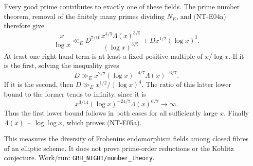 Every good prime contributes to exactly one of these fields.
The prime number theorem, removal of the finitely many primes
dividing $N_E$, and (NT-E04a) therefore give
\[
 \frac{x}{\log x}\ll_E
    D^{7/10}\frac{x^{4/5}\Lambda(x)^{3/5}}{(\log x)^{3/5}}
                      +D x^{1/2}(\log x)^3.               \tag{NT-E05c}
\]
At least one right-hand term is at least a fixed positive
multiple of $x/\log x$. If it is the first, solving the
inequality gives
\[
 D\gg_E x^{2/7}(\log x)^{-4/7}\Lambda(x)^{-6/7}.
\]
If it is the second, then $D\gg_E x^{1/2}/(\log x)^4$.
The ratio of this latter lower bound to the former tends to
infinity, since it is
\[
 x^{3/14}(\log x)^{-24/7}\Lambda(x)^{6/7}\longrightarrow\infty.
\]
Thus the first lower bound follows in both cases for all
sufficiently large $x$. Finally
$\Lambda(x)\sim\log\log x$, which proves (NT-E05a).

This measures the diversity of Frobenius endomorphism fields
among closed fibres of an elliptic scheme. It does not prove
prime-order reductions or the Koblitz conjecture. Work/run:
\texttt{GRH\_NIGHT/number\_theory}.
